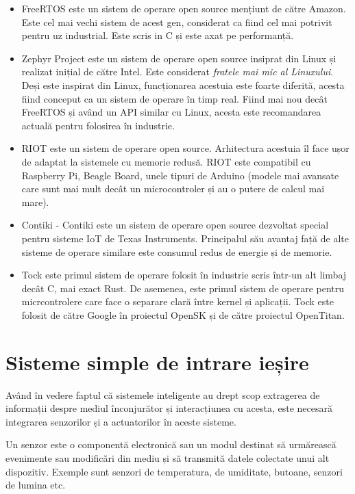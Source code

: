 \begin{itemize}
  \item FreeRTOS este un sistem de operare open source mențiunt de către Amazon.
    Este cel mai vechi sistem de acest gen, considerat ca fiind cel mai potrivit pentru uz industrial.
    Este scris in C și este axat pe performanță.
  \item Zephyr Project este un sistem de operare open source insiprat din Linux și realizat inițial de către Intel.
    Este considerat \textit{fratele mai mic al Linuxului}.
    Deși este inspirat din Linux, funcționarea acestuia este foarte diferită, acesta fiind conceput ca un sistem de operare în timp real.
    Fiind mai nou decât FreeRTOS și având un API similar cu Linux, acesta este recomandarea actuală pentru folosirea în industrie.
  \item RIOT este un sistem de operare open source.
    Arhitectura acestuia îl face ușor de adaptat la sistemele cu memorie redusă.
    RIOT este compatibil cu Raspberry Pi, Beagle Board, unele tipuri de Arduino (modele mai avansate care sunt mai mult decât un microcontroler și au o putere de calcul mai mare).
  \item Contiki - Contiki este un sistem de operare open source dezvoltat special pentru sisteme IoT de Texas Instruments.
    Principalul său avantaj față de alte sisteme de operare similare este consumul redus de energie și de memorie.
  \item Tock este primul sistem de operare folosit în industrie scris într-un alt limbaj decât C, mai exact Rust.
    De asemenea, este primul sistem de operare pentru micrcontrolere care face o separare clară între kernel și aplicații.
    Tock este folosit de către Google în proiectul OpenSK și de către proiectul OpenTitan.
\end{itemize}

\section{Sisteme simple de intrare ieșire}
\label{sec:embed:io}

Având în vedere faptul că sistemele inteligente au drept scop extragerea de informații despre mediul înconjurător și interacțiunea cu acesta, este necesară integrarea senzorilor și a actuatorilor în aceste sisteme.

Un senzor este o componentă electronică sau un modul destinat să urmărească evenimente sau modificări din mediu și să transmită datele colectate unui alt dispozitiv.
Exemple sunt senzori de temperatura, de umiditate, butoane, senzori de lumina etc.

